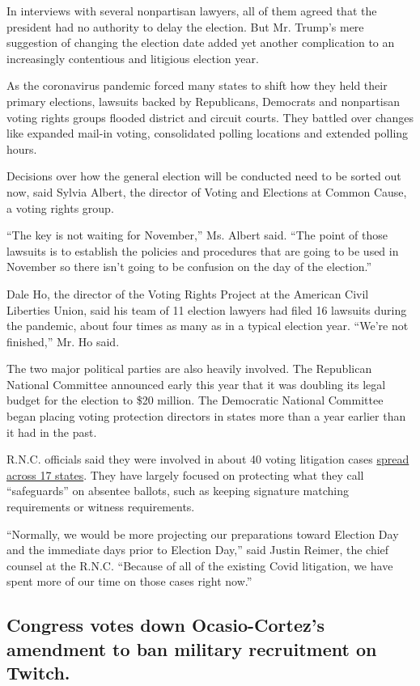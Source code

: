 In interviews with several nonpartisan lawyers, all of them agreed that
the president had no authority to delay the election. But Mr. Trump's
mere suggestion of changing the election date added yet another
complication to an increasingly contentious and litigious election year.

As the coronavirus pandemic forced many states to shift how they held
their primary elections, lawsuits backed by Republicans, Democrats and
nonpartisan voting rights groups flooded district and circuit courts.
They battled over changes like expanded mail-in voting, consolidated
polling locations and extended polling hours.

Decisions over how the general election will be conducted need to be
sorted out now, said Sylvia Albert, the director of Voting and Elections
at Common Cause, a voting rights group.

``The key is not waiting for November,'' Ms. Albert said. ``The point of
those lawsuits is to establish the policies and procedures that are
going to be used in November so there isn't going to be confusion on the
day of the election.''

Dale Ho, the director of the Voting Rights Project at the American Civil
Liberties Union, said his team of 11 election lawyers had filed 16
lawsuits during the pandemic, about four times as many as in a typical
election year. ``We're not finished,'' Mr. Ho said.

The two major political parties are also heavily involved. The
Republican National Committee announced early this year that it was
doubling its legal budget for the election to \$20 million. The
Democratic National Committee began placing voting protection directors
in states more than a year earlier than it had in the past.

R.N.C. officials said they were involved in about 40 voting litigation
cases \href{https://protectthevote.com/}{spread across 17 states}. They
have largely focused on protecting what they call ``safeguards'' on
absentee ballots, such as keeping signature matching requirements or
witness requirements.

``Normally, we would be more projecting our preparations toward Election
Day and the immediate days prior to Election Day,'' said Justin Reimer,
the chief counsel at the R.N.C. ``Because of all of the existing Covid
litigation, we have spent more of our time on those cases right now.''

\hypertarget{congress-votes-down-ocasio-cortezs-amendment-to-ban-military-recruitment-on-twitch}{%
\subsection{Congress votes down Ocasio-Cortez's amendment to ban
military recruitment on
Twitch.}\label{congress-votes-down-ocasio-cortezs-amendment-to-ban-military-recruitment-on-twitch}}


